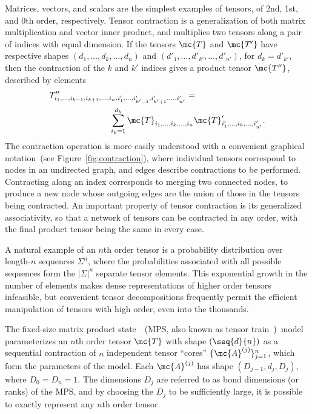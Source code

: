 %
Matrices, vectors, and scalars are the simplest examples of tensors, of 2nd, 1st, and 0th order, respectively. Tensor contraction is a generalization of both matrix multiplication and vector inner product, and multiplies two tensors along a pair of indices with equal dimension. If the tensors $\mc{T}$ and $\mc{T'}$ have respective shapes $(d_1,\ldots,d_k,\ldots,d_n)$ and $(d'_1,\ldots,d'_{k'},\ldots,d'_{n'})$, for $d_k = d'_{k'}$, then the contraction of the $k$ and $k'$ indices gives a product tensor $\mc{T''}$, described by elements
%
\begin{align}
\label{eq:contraction}
& T''_{i_1,\ldots,i_{k-1},i_{k+1},\ldots,i_{n},i'_1,\ldots,i'_{k'-1},i'_{k'+1},\ldots,i'_{n'}} = \nonumber\\
&\hspace{2.5cm} \sum_{i_k=1}^{d_k}\mc{T}_{i_1,\ldots,i_k,\ldots,i_{n}} \mc{T}'_{i'_1,\ldots,i_{k},\ldots,i'_{n'}}.
\end{align}
%
The contraction operation  is more easily understood with a convenient graphical notation~(see Figure~\ref{fig:contraction}), where individual tensors correspond to nodes in an undirected graph, and edges describe contractions to be performed. Contracting along an index corresponds to merging two connected nodes, to produce a new node whose outgoing edges are the union of those in the tensors being contracted. An important property of tensor contraction is its generalized associativity, so that a network of tensors can be contracted in any order, with the final product tensor being the same in every case.

A natural example of an $n$th order tensor is a probability distribution over length-$n$ sequences $\Sigma^n$, where the probabilities associated with all possible sequences form the $|\Sigma|^n$ separate tensor elements. This exponential growth in the number of elements makes dense representations of higher order tensors infeasible, but convenient tensor decompositions frequently permit the efficient manipulation of tensors with high order, even into the thousands.

The fixed-size matrix product state~\citep{perez2007}~(MPS, also known as tensor train~\citep{oseledets2011})~model parameterizes an $n$th order tensor $\mc{T}$ with shape $(\seq{d}{n})$ as a sequential contraction of $n$ independent tensor ``cores'' $\{\mc{A}^{(j)}\}_{j=1}^n$, which form the parameters of the model. Each $\mc{A}^{(j)}$ has shape $(D_{j-1}, d_j, D_j)$, where $D_0 = D_n = 1$. The dimensions $D_j$ are referred to as bond dimensions (or ranks) of the MPS, and by choosing the $D_j$ to be sufficiently large, it is possible to exactly represent any $n$th order tensor.

